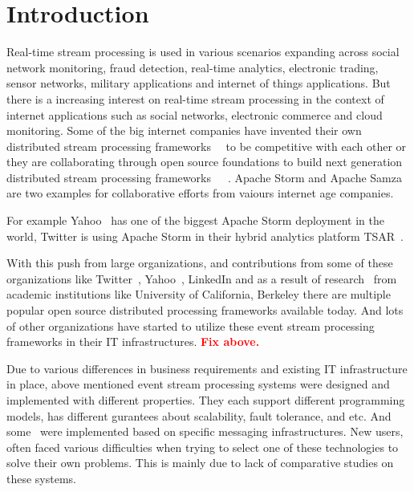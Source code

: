 \documentclass{sig-alternate}
\begin{document}



\section{Introduction}
Real-time stream processing is used in various scenarios
expanding across social network monitoring, fraud detection, real-time
analytics, electronic trading, sensor networks, military applications
and internet of things applications. But there is a increasing
interest on real-time stream processing in the context of internet
applications such as social networks, electronic commerce and cloud
monitoring. Some of the big internet companies have invented their own
distributed stream processing frameworks~\cite{akidau2013millwheel}~\cite{murray2013naiad}  to be
competitive with each other or they are collaborating through open source foundations to
build next generation distributed stream processing frameworks~\cite{asf:2014:samza}~\cite{neumeyer2010s4}~\cite{toshniwal2014storm}. Apache
Storm and Apache Samza~\cite{asf:2014:samza} are two examples for collaborative efforts from
vaiours internet age companies. 

For example
Yahoo~\cite{hortonworks:2014:storm} has one of the biggest Apache Storm deployment in the
world, Twitter is using Apache Storm in their hybrid analytics
platform TSAR~\cite{twitter:2014:tsar}. 

With this push from large organizations, and contributions from some
of these organizations like Twitter~\cite{toshniwal2014storm},
Yahoo~\cite{neumeyer2010s4}, LinkedIn and as a
result of research~\cite{zaharia2013discretized}
from academic institutions like University of California, Berkeley
there are multiple popular open source distributed processing frameworks
available today. And lots of other organizations have started to utilize
 these event stream processing frameworks in their IT infrastructures.
 \textcolor{Red}{\textbf{Fix above.}}

Due to various differences in business requirements and existing
IT infrastructure in place, above mentioned event stream processing
systems were designed and implemented with different properties. They
each support different programming models, has different gurantees about
 scalability, fault tolerance, and etc. And some~\cite{asf:2014:samza} were implemented based on
 specific messaging infrastructures. New users, often faced various difficulties
 when trying to select one of these technologies to solve their own problems.
 This is mainly due to lack of comparative studies on these systems.
\end{document}
